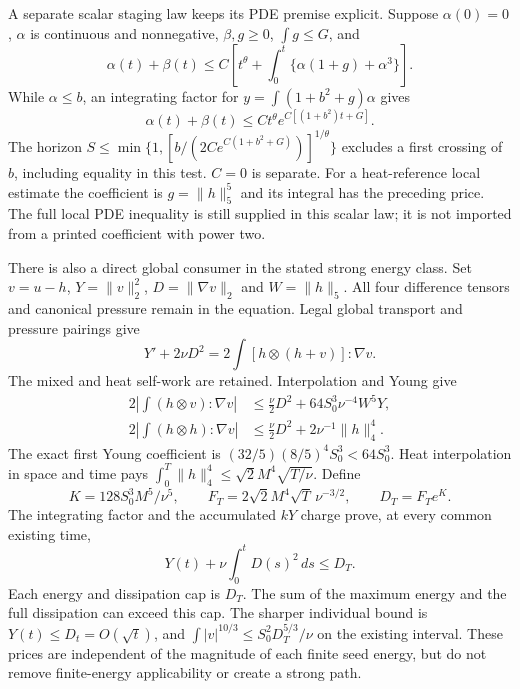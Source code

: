 \documentclass[11pt]{article}
\begin{document}
A separate scalar staging law keeps its PDE premise explicit. Suppose
$\alpha(0)=0$, $\alpha$ is continuous and nonnegative, $\beta,g\ge0$,
$\int g\le G$, and
\[
 \alpha(t)+\beta(t)\le C\left[t^\theta+
      \int_0^t\{\alpha(1+g)+\alpha^3\}\right].
\]
While $\alpha\le b$, an integrating factor for
$y=\int(1+b^2+g)\alpha$ gives
\[
 \alpha(t)+\beta(t)\le Ct^\theta
                 e^{C[(1+b^2)t+G]}.
\]
The horizon $S\le\min\{1,[b/(2Ce^{C(1+b^2+G)})]^{1/\theta}\}$
excludes a first crossing of $b$, including equality in this test.
$C=0$ is separate. For a heat-reference local estimate the coefficient
is $g=\|h\|_5^5$ and its integral has the preceding price. The full local
PDE inequality is still supplied in this scalar law; it is not imported
from a printed coefficient with power two.

There is also a direct global consumer in the stated strong energy class.
Set $v=u-h$, $Y=\|v\|_2^2$, $D=\|\nabla v\|_2$ and $W=\|h\|_5$.
All four difference tensors and canonical pressure remain in the equation.
Legal global transport and pressure pairings give
\[
 Y'+2\nu D^2=2\int[h\otimes(h+v)]:\nabla v.
\]
The mixed and heat self-work are retained. Interpolation and Young give
\begin{align*}
 2\left|\int(h\otimes v):\nabla v\right|
   &\le\tfrac\nu2D^2+64S_0^3\nu^{-4}W^5Y,\\
 2\left|\int(h\otimes h):\nabla v\right|
   &\le\tfrac\nu2D^2+2\nu^{-1}\|h\|_4^4.
\end{align*}
The exact first Young coefficient is
$(32/5)(8/5)^4S_0^3<64S_0^3$. Heat interpolation in space and time pays
$\int_0^T\|h\|_4^4\le\sqrt2 M^4\sqrt{T/\nu}$. Define
\[
 K=128S_0^3M^5/\nu^5,\qquad
 F_T=2\sqrt2 M^4\sqrt T\,\nu^{-3/2},\qquad
 D_T=F_Te^K.
\]
The integrating factor and the accumulated $kY$ charge prove, at every
common existing time,
\[
 Y(t)+\nu\int_0^tD(s)^2\,ds\le D_T.
\]
Each energy and dissipation cap is $D_T$. The sum of the maximum energy
and the full dissipation can exceed this cap.
The sharper individual bound is $Y(t)\le D_t=O(\sqrt t)$, and
$\int|v|^{10/3}\le S_0^2D_T^{5/3}/\nu$ on the existing interval.
These prices are independent of the magnitude of each finite seed energy,
but do not remove finite-energy applicability or create a strong path.
\end{document}
